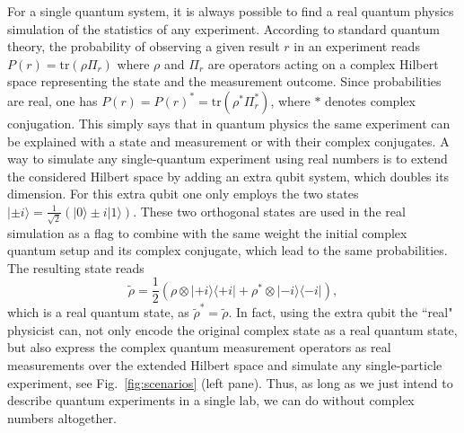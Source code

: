 \documentclass[onecolumn,prx,amsmath,amssymb,12pt]{revtex4-2}
\def\bra#1{\langle#1|} \def\ket#1{|#1\rangle}
\def\proj#1{\ket{#1}\!\bra{#1}}
\def\tr{\mbox{tr}}
\begin{document}
For a single quantum system, it is always possible to find a real quantum physics simulation of the statistics of any experiment. According to standard quantum theory, the probability of observing a given result $r$ in an experiment reads $P(r)=\tr(\rho \Pi_r)$ where $\rho$ and $\Pi_r$ are operators acting on a complex Hilbert space representing the state and the measurement outcome. Since probabilities are real, one has $P(r)=P(r)^*=\tr(\rho^* \Pi^*_r)$, where $*$ denotes complex conjugation. This simply says that in quantum physics the same experiment can be explained with a state and measurement or with their complex conjugates. A way to simulate any single-quantum experiment using real numbers is to extend the considered Hilbert space by adding an extra qubit system, which doubles its dimension. For this extra qubit one only employs the two states $\ket{\pm i}=\frac{1}{\sqrt{2}}(\ket{0}\pm i\ket{1})$. These two orthogonal states are used in the real simulation as a flag to combine with the same weight the initial complex quantum setup and its complex conjugate, which lead to the same probabilities. The resulting state reads 
\begin{equation}
\label{eq:realstate}
\tilde{\rho} = \frac{1}{2}(\rho\otimes\proj{+i} + \rho^*\otimes\proj{-i}) ,
\end{equation}
which is a real quantum state, as $\tilde{\rho}^*=\tilde{\rho}$. In fact, using the extra qubit the ``real" physicist can, not only encode the original complex state as a real quantum state, but also express the complex quantum measurement operators as real measurements over the extended Hilbert space and simulate any single-particle experiment, see Fig.~\ref{fig:scenarios} (left pane). Thus, as long as we just intend to describe quantum experiments in a single lab, we can do without complex numbers altogether.
\end{document}
